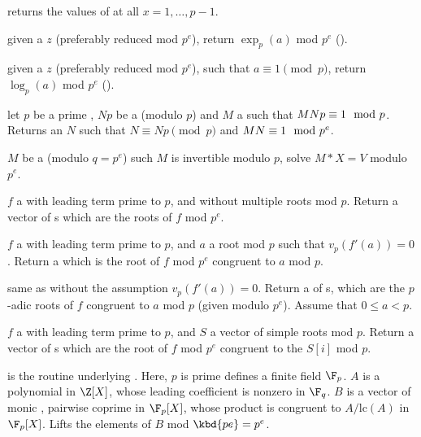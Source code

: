  returns the values of
 at all $x = 1, \dots, p-1$.

 given a  $z$ (preferably
reduced mod $p^e$), return $\exp_p(a)$ mod $p^e$ ().

 given a  $z$ (preferably
reduced mod $p^e$), such that $a \equiv 1 \pmod{p}$, return
$\log_p(a)$ mod $p^e$ ().


 let
$p$ be a prime , $Np$ be a  (modulo $p$) and
$M$ a  such that $M\*Np \equiv 1 \mod p$.
Returns an  $N$ such that $N \equiv Np \pmod{p}$ and
$M\*N \equiv 1 \mod p^e$.

$M$ be a  (modulo $q=p^e$) such $M$ is invertible modulo $p$,
solve $M*X = V$ modulo $p^e$.


 $f$ a  with leading
term prime to $p$, and without multiple roots mod $p$. Return a vector
of s which are the roots of $f$ mod $p^e$.

 $f$ a  with
leading term prime to $p$, and $a$ a root mod $p$ such that
$v_p(f'(a))=0$.  Return a  which is the root of $f$ mod $p^e$
congruent to $a$ mod $p$.

 same as 
without the assumption $v_p(f'(a)) = 0$. Return a  of s,
which are the $p$-adic roots of $f$ congruent to $a$ mod $p$ (given modulo
$p^e$). Assume that $0 \leq a < p$.

 $f$ a  with
leading term prime to $p$, and $S$ a vector of simple roots mod $p$. Return a
vector of s which are the root of $f$ mod $p^e$ congruent to the
$S[i]$ mod $p$.

 is
the routine underlying . Here, $p$ is prime
defines a finite field $\F_p$. $A$ is a polynomial in
$\Z[X]$, whose leading coefficient is nonzero in $\F_q$. $B$ is a vector of
monic , pairwise coprime in $\F_p[X]$, whose product is congruent to
$A/\text{lc}(A)$ in $\F_p[X]$. Lifts the elements of $B$ mod $\kbd{pe} = p^e$.

